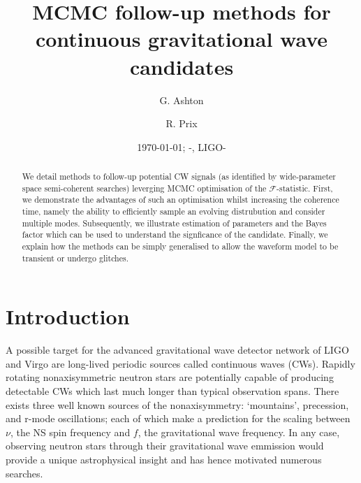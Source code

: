 \documentclass[aps, prd, twocolumn, superscriptaddress, floatfix, showpacs, nofootinbib, longbibliography]{revtex4-1}
\newcommand{\dcc}{LIGO-{\color{red}}}
\begin{document}
\title{MCMC follow-up methods for continuous gravitational wave candidates}

    \author{G. Ashton}
    \author{R. Prix}

\date{\today}

\begin{abstract}
We detail methods to follow-up potential CW signals (as identified by
wide-parameter space semi-coherent searches) leverging MCMC optimisation of the
$\mathcal{F}$-statistic. First, we demonstrate the advantages of such an
optimisation whilst increasing the coherence time, namely the ability to
efficiently sample an evolving distrubution and consider multiple modes.
Subsequently, we illustrate estimation of parameters and the Bayes factor which
can be used to understand the signficance of the candidate. Finally, we explain
how the methods can be simply generalised to allow the waveform model to be
transient or undergo glitches.

\end{abstract}


\date{\commitDATE; \commitIDshort-\commitSTATUS, \dcc}

\maketitle


\section{Introduction}

A possible target for the advanced gravitational wave detector network of LIGO
and Virgo are long-lived periodic sources called continuous waves (CWs).
Rapidly rotating nonaxisymmetric neutron stars are potentially capable of
producing detectable CWs which last much longer than typical observation spans.
There exists three well known sources of the nonaxisymmetry: `mountains',
precession, and r-mode oscillations; each of which make a prediction for the
scaling between $\nu$, the NS spin frequency and $f$, the gravitational wave
frequency. In any case, observing neutron stars through their gravitational
wave emmission would provide a unique astrophysical insight and has hence
motivated numerous searches.
\end{document}
